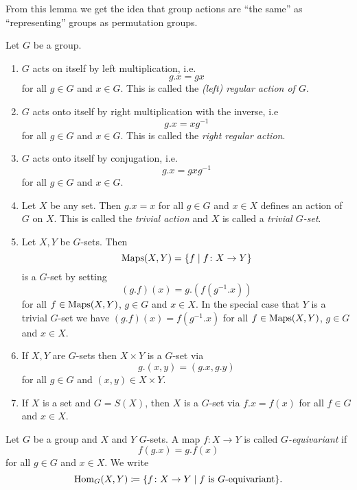 From this lemma we get the idea that group actions are ``the same'' as ``representing'' groups as permutation groups.


\begin{expls}
  Let $G$ be a group.
  \begin{enumerate}[label=\emph{\alph*)},leftmargin=*]
    \item
      $G$ acts on itself by left multiplication, i.e.\
      \[
          g.x
        = gx
      \]
      for all $g \in G$ and $x \in G$.
      This is called the \emph{(left) regular action of $G$}.
    \item
      $G$ acts onto itself by right multiplication with the inverse, i.e
      \[
          g.x
        = xg^{-1}
      \]
      for all $g \in G$ and $x \in G$. This is called the \emph{right regular action}.
    \item
      $G$ acts onto itself by conjugation, i.e.\
      \[
          g.x
        = gxg^{-1}
      \]
      for all $g \in G$ and $x \in G$.
    \item
      Let $X$ be any set.
      Then $g.x = x$ for all $g \in G$ and $x \in X$ defines an action of $G$ on $X$.
      This is called the \emph{trivial action} and $X$ is called a \emph{trivial $G$-set}.
    \item
      Let $X, Y$ be $G$-sets. Then
      \[
          \operatorname{Maps}(X,Y)
        = \{f \mid f \colon X \to Y\}
      \]
      is a $G$-set by setting
      \[
          (g.f)(x)
        = g.\left(f\left(g^{-1}.x\right)\right)
      \]
      for all $f \in \operatorname{Maps}(X,Y)$, $g \in G$ and $x \in X$.
      In the special case that $Y$ is a trivial $G$-set we have $(g.f)(x) = f(g^{-1}.x)$ for all $f \in \operatorname{Maps}(X,Y)$, $g \in G$ and $x \in X$.
    \item
      If $X, Y$ are $G$-sets then $X \times Y$ is a $G$-set via
      \[
          g.(x,y)
        = (g.x,g.y)
      \]
      for all $g \in G$ and $(x,y) \in X \times Y$.
    \item
      If $X$ is a set and $G = S(X)$, then $X$ is a $G$-set via $f.x = f(x)$ for all $f \in G$ and $x \in X$.
  \end{enumerate}
\end{expls}


\begin{defi}
  Let $G$ be a group and $X$ and $Y$ $G$-sets.
  A map $f \colon X \to Y$ is called \emph{$G$-equivariant} if
  \[
      f(g.x)
    = g.f(x)
  \]
  for all $g \in G$ and $x \in X$.
  We write
  \[
              \operatorname{Hom}_G(X,Y)
    \coloneqq \{
                f \colon X \to Y
              \mid
                f \text{ is $G$-equivariant}
              \}.
  \]
\end{defi}


